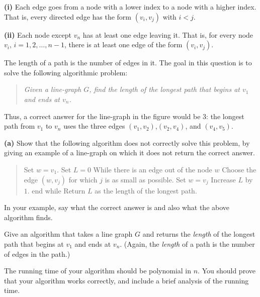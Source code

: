 \documentclass[12pt]{article}
\begin{document}
\begin{enumerate}
{\bf (i)} 
Each edge goes from a node with a lower index
to a node with a higher index.
That is, every directed edge has the form 
$(v_i, v_j)$ with $i < j$.

\smallskip

{\bf (ii)} Each node except $v_n$ has at least one edge leaving it.
That is, for every node $v_i$, $i = 1, 2, \ldots, n-1$,
there is at least one edge of the form $(v_i,v_j)$.

\smallskip

The length of a path is the number of edges in it.
The goal in this question is to solve the following algorithmic
problem:
\begin{quote}
{\em Given a line-graph $G$, find the length of the longest path that begins 
at $v_1$ and ends at $v_n$.}
\end{quote}

Thus, a correct answer for the line-graph in the figure would be $3$:
the longest path from $v_1$ to $v_n$ uses the three edges
$(v_1, v_2)$,$(v_2, v_4)$, and $(v_4,v_5)$.

{\bf (a)}  Show that the following algorithm does not
correctly solve this problem, by giving an example of a line-graph on
which it does not return the correct answer.
\begin{quote}
\begin{code}
Set $w = v_1$.
Set $L = 0$
While there is an edge out of the node $w$
  Choose the edge $(w,v_j)$
     for which $j$ is as small as possible.
  Set $w = v_j$
  Increase $L$ by $1$.
end while
Return $L$ as the length of the longest path.
\end{code}
\end{quote}
In your example, say what the correct answer is and
also what the above algorithm finds.

Give an algorithm that takes a line graph $G$ and returns the
{\em length} of the longest path that begins at $v_1$ and ends at $v_n$.
(Again, the {\em length} of a path is the number of edges in the path.)

The running time of your algorithm should be polynomial in $n$.
You should prove that your algorithm works correctly, and include a 
brief analysis of the running time.

\end{enumerate}
\end{document}
